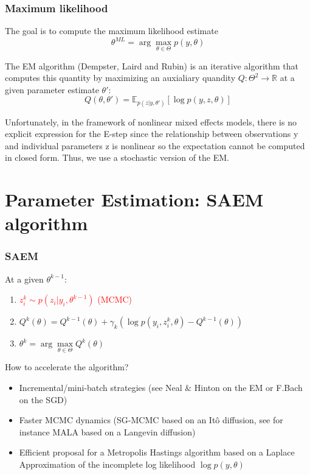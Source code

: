 \documentclass[xcolor={dvipsnames}]{beamer}
\begin{document}
\begin{frame}
\frametitle{Maximum likelihood}

The goal is to compute the maximum likelihood estimate
\begin{equation}
\theta^{ML} = \arg \max \limits_{\theta \in \Theta} p(y,\theta)
\end{equation}

The EM algorithm (Dempster, Laird and Rubin) is an iterative algorithm that computes this quantity by maximizing an auxialiary quandity $Q: \Theta^2 \to \mathbb{R}$ at a given parameter estimate $\theta'$:
\begin{equation}
Q(\theta, \theta') = \mathbb{E}_{p(z|y,\theta')}\left[ \log p(y, z, \theta) \right]
\end{equation}

Unfortunately, in the framework of nonlinear mixed effects models, there is no explicit expression for the E-step since the relationship between observations y and individual parameters z is nonlinear so the expectation cannot be computed in closed form. Thus, we use a stochastic version of the EM.
\end{frame}



\section{Parameter Estimation: SAEM algorithm}

\begin{frame}
\frametitle{SAEM}
At a given $\theta^{k-1}$:
\begin{enumerate}
  \item \textcolor{red}{$z_i^k \sim p(z_i|y_i,\theta^{k-1})$ \quad (MCMC)}
  \item $Q^k(\theta) = Q^{k-1}(\theta)+ \gamma_k(\log p(y_i, z_i^k, \theta) - Q^{k-1}(\theta))$
  \item $\theta ^k = \arg \max \limits_{\theta \in \Theta} Q^k(\theta)$
\end{enumerate}


How to accelerate the algorithm?
\begin{itemize}
  \item Incremental/mini-batch strategies (see Neal $\&$ Hinton on the EM or F.Bach on the SGD)
  \item Faster MCMC dynamics (SG-MCMC based on an Itô diffusion, see for instance MALA based on a Langevin diffusion)
  \item Efficient proposal for a Metropolis Hastings algorithm based on a Laplace Approximation of the incomplete log likelihood $\log p(y,\theta)$
\end{itemize}


\end{frame}
\end{document}
